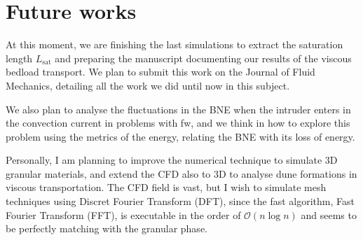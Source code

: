 
\section{Future works}
\label{sec:trabalhosFuturos}

    At this moment, we are finishing the last simulations to extract the saturation length $L_\textrm{sat}$ and preparing the manuscript documenting our results of the viscous bedload transport. We plan to submit this work on the Journal of Fluid Mechanics, detailing all the work we did until now in this subject.

    We also plan to analyse the fluctuations in the BNE when the intruder enters in the convection current in problems with fw, and we think in how to explore this problem using the metrics of the energy, relating the BNE with its loss of energy.

    Personally, I am planning to improve the numerical technique to simulate 3D granular materials, and extend the CFD also to 3D to analyse dune formations in viscous transportation. The CFD field is vast, but I wish to simulate mesh techniques using Discret Fourier Transform (DFT), since the fast algorithm, Fast Fourier Transform (FFT), is executable in the order of $\mathcal{O}(n \log{n})$ and seems to be perfectly matching with the granular phase.





